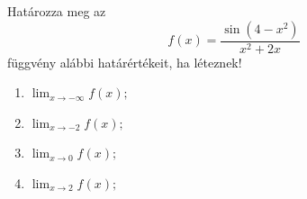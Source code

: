\documentclass[11pt]{scrartcl}
\begin{document}
Határozza meg az
\[
	f(x) = \frac{\sin(4 - x^2)}{x^2 + 2x}
\]
függvény alábbi határértékeit, ha léteznek!
\begin{enumerate}
	\item \(\displaystyle \lim_{x \to -\infty} f(x);\)

	\item \(\displaystyle \lim_{x \to -2} f(x);\)

	\item \(\displaystyle \lim_{x \to 0} f(x);\)

	\item \(\displaystyle \lim_{x \to 2} f(x);\)
\end{enumerate}
\end{document}
